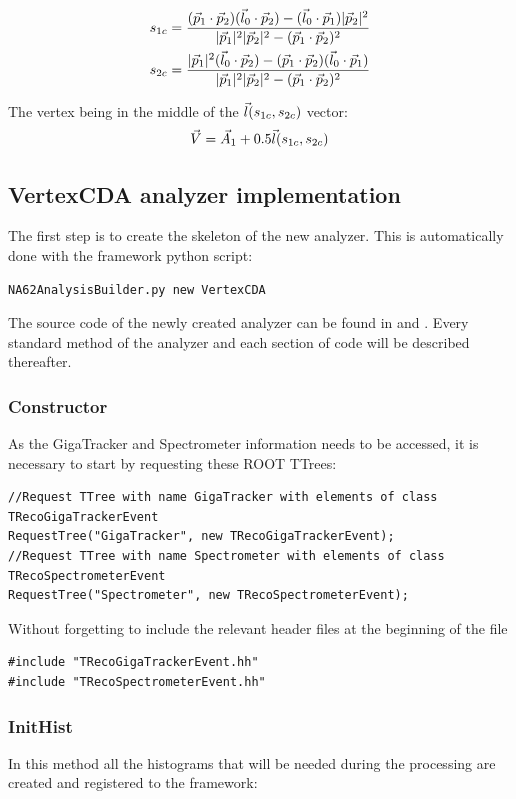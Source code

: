 \begin{align}
	s_{1c} &= \frac{(\vec{p}_{1}\cdot\vec{p}_{2})(\vec{l}_{0}\cdot\vec{p}_{2}) -
	(\vec{l}_{0}\cdot\vec{p}_{1})|\vec{p}_{2}|^2}{|\vec{p}_{1}|^2|\vec{p}_{2}|^2 - (\vec{p}_{1}\cdot\vec{p}_{2})^2}\\
	s_{2c} &= \frac{|\vec{p}_{1}|^2(\vec{l}_{0}\cdot\vec{p}_{2}) -
	(\vec{p}_{1}\cdot\vec{p}_{2})(\vec{l}_{0}\cdot\vec{p}_{1})}{|\vec{p}_{1}|^2|\vec{p}_{2}|^2 - (\vec{p}_{1}\cdot\vec{p}_{2})^2}
\end{align}

The vertex being in the middle of the $\vec{l}(s_{1c},s_{2c})$ vector:
\begin{equation}
	\vec{V} = \vec{A}_{1} + 0.5\vec{l}(s_{1c},s_{2c})
\end{equation}

\subsection{VertexCDA analyzer implementation}
The first step is to create the skeleton of the new analyzer. This is
automatically done with the framework python script:
\begin{lstlisting}
NA62AnalysisBuilder.py new VertexCDA
\end{lstlisting}

The source code of the newly created analyzer can be found in
 and . Every standard method
of the analyzer and each section of code will be described thereafter.

\subsubsection{Constructor}
As the GigaTracker and Spectrometer information needs to be accessed, it is necessary to start by 
requesting these ROOT TTrees:

\begin{lstlisting}
//Request TTree with name GigaTracker with elements of class TRecoGigaTrackerEvent
RequestTree("GigaTracker", new TRecoGigaTrackerEvent);
//Request TTree with name Spectrometer with elements of class TRecoSpectrometerEvent
RequestTree("Spectrometer", new TRecoSpectrometerEvent);
\end{lstlisting}
 
 Without forgetting to include the relevant header files at the beginning of the file
\begin{lstlisting}
#include "TRecoGigaTrackerEvent.hh"
#include "TRecoSpectrometerEvent.hh"
\end{lstlisting}

\subsubsection{InitHist}
In this method all the histograms that will be needed during the processing are created and
registered to the framework:

